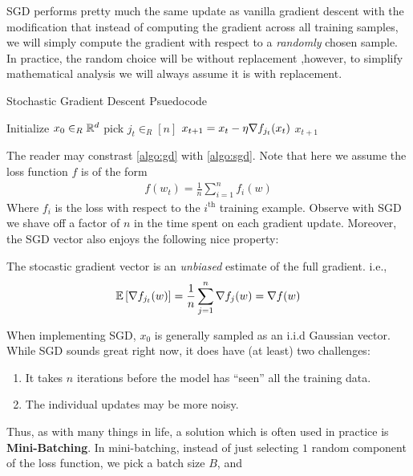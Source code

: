 SGD performs pretty much the same update as vanilla gradient descent with the modification that instead of computing the gradient across all
training samples, we will simply compute the gradient with respect to a {\em randomly} chosen sample. In practice, the random choice will be without replacement
,however, to simplify mathematical analysis we will always assume it is with replacement. 
        \begin{algorithm}[H]
        \caption{Stochastic Gradient Descent Psuedocode}
        \label{algo:sgd}
        \begin{algorithmic}[1]
        \State Initialize $x_0 \in_R \mathbb{R}^d$
            \State pick $j_t \in_R [n]$
            \State $x_{t+1} = x_t - \eta \nabla f_{j_t}(x_t)$
        \EndWhile
        \Return $x_{t+1}$
        \EndProcedure
        \end{algorithmic}
        \end{algorithm}
The reader may constrast \autoref{algo:gd} with \autoref{algo:sgd}. Note that here we assume the loss function $f$ is of the form
\begin{align*}
    f(w_t) = \frac{1}{n} \sum_{i = 1}^n f_i(w)
\end{align*}
Where $f_i$ is the loss with respect to the $i^{\text{th}}$ training example. Observe with SGD we shave off a factor of $n$ in the time spent
on each gradient update. Moreover, the SGD vector also enjoys the following nice property:
\begin{prop}
    The stocastic gradient vector is an {\em unbiased} estimate of the full gradient. i.e.,
    \begin{align*}
        \mathbb{E}\left[\nabla f_{j_t}(w)\right] = \frac{1}{n} \sum_{j = 1}^n \nabla f_j(w) = \nabla f(w)
    \end{align*}
\end{prop}
When implementing SGD, $x_0$ is generally sampled as an i.i.d Gaussian vector. While SGD sounds great right now, it does have
(at least) two challenges:
\begin{enumerate}
    \item It takes $n$ iterations before the model has ``seen'' all the training data.
    \item The individual updates may be more noisy.
\end{enumerate}
Thus, as with many things in life, a solution which is often used in practice is {\bf Mini-Batching}.
In mini-batching, instead of just selecting $1$ random component of the loss function, we pick a batch size $B$, and
